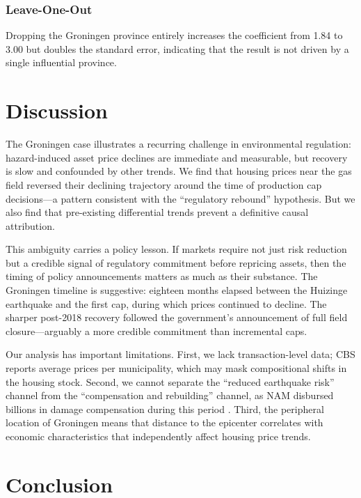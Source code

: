 \documentclass[12pt]{article}
\begin{document}
\subsubsection*{Leave-One-Out} Dropping the Groningen province entirely increases the coefficient from 1.84 to 3.00 but doubles the standard error, indicating that the result is not driven by a single influential province.



\section{Discussion}\label{sec:discussion}

The Groningen case illustrates a recurring challenge in environmental regulation: hazard-induced asset price declines are immediate and measurable, but recovery is slow and confounded by other trends. We find that housing prices near the gas field reversed their declining trajectory around the time of production cap decisions---a pattern consistent with the ``regulatory rebound'' hypothesis. But we also find that pre-existing differential trends prevent a definitive causal attribution.

This ambiguity carries a policy lesson. If markets require not just risk reduction but a credible signal of regulatory commitment before repricing assets, then the timing of policy announcements matters as much as their substance. The Groningen timeline is suggestive: eighteen months elapsed between the Huizinge earthquake and the first cap, during which prices continued to decline. The sharper post-2018 recovery followed the government's announcement of full field closure---arguably a more credible commitment than incremental caps.

Our analysis has important limitations. First, we lack transaction-level data; CBS reports average prices per municipality, which may mask compositional shifts in the housing stock. Second, we cannot separate the ``reduced earthquake risk'' channel from the ``compensation and rebuilding'' channel, as NAM disbursed billions in damage compensation during this period \citep{nam2020}. Third, the peripheral location of Groningen means that distance to the epicenter correlates with economic characteristics that independently affect housing price trends.

\section{Conclusion}
\end{document}

